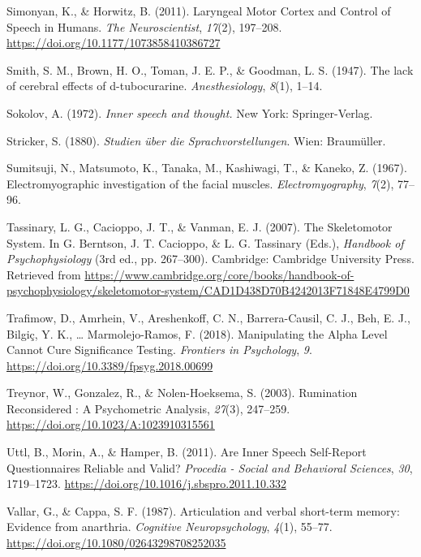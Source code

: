 \documentclass[a4paper,12pt,twoside,openright,oldfontcommands]{memoir}
\begin{document}
\hypertarget{ref-simonyan_laryngeal_2011}{}
Simonyan, K., \& Horwitz, B. (2011). Laryngeal Motor Cortex and Control
of Speech in Humans. \emph{The Neuroscientist}, \emph{17}(2), 197--208.
\url{https://doi.org/10.1177/1073858410386727}

\hypertarget{ref-smith_lack_1947}{}
Smith, S. M., Brown, H. O., Toman, J. E. P., \& Goodman, L. S. (1947).
The lack of cerebral effects of d-tubocurarine. \emph{Anesthesiology},
\emph{8}(1), 1--14.

\hypertarget{ref-sokolov_inner_1972}{}
Sokolov, A. (1972). \emph{Inner speech and thought.} New York:
Springer-Verlag.

\hypertarget{ref-stricker_studien_1880}{}
Stricker, S. (1880). \emph{Studien über die Sprachvorstellungen}. Wien:
Braumüller.

\hypertarget{ref-sumitsuji_electromyographic_1967}{}
Sumitsuji, N., Matsumoto, K., Tanaka, M., Kashiwagi, T., \& Kaneko, Z.
(1967). Electromyographic investigation of the facial muscles.
\emph{Electromyography}, \emph{7}(2), 77--96.

\hypertarget{ref-berntson_skeletomotor_2007}{}
Tassinary, L. G., Cacioppo, J. T., \& Vanman, E. J. (2007). The
Skeletomotor System. In G. Berntson, J. T. Cacioppo, \& L. G. Tassinary
(Eds.), \emph{Handbook of Psychophysiology} (3rd ed., pp. 267--300).
Cambridge: Cambridge University Press. Retrieved from
\url{https://www.cambridge.org/core/books/handbook-of-psychophysiology/skeletomotor-system/CAD1D438D70B4242013F71848E4799D0}

\hypertarget{ref-trafimow_manipulating_2018}{}
Trafimow, D., Amrhein, V., Areshenkoff, C. N., Barrera-Causil, C. J.,
Beh, E. J., Bilgiç, Y. K., \ldots{} Marmolejo-Ramos, F. (2018).
Manipulating the Alpha Level Cannot Cure Significance Testing.
\emph{Frontiers in Psychology}, \emph{9}.
\url{https://doi.org/10.3389/fpsyg.2018.00699}

\hypertarget{ref-treynor_rumination_2003}{}
Treynor, W., Gonzalez, R., \& Nolen-Hoeksema, S. (2003). Rumination
Reconsidered : A Psychometric Analysis, \emph{27}(3), 247--259.
\url{https://doi.org/10.1023/A:1023910315561}

\hypertarget{ref-Uttl2011}{}
Uttl, B., Morin, A., \& Hamper, B. (2011). Are Inner Speech Self-Report
Questionnaires Reliable and Valid? \emph{Procedia - Social and
Behavioral Sciences}, \emph{30}, 1719--1723.
\url{https://doi.org/10.1016/j.sbspro.2011.10.332}

\hypertarget{ref-vallar_articulation_1987}{}
Vallar, G., \& Cappa, S. F. (1987). Articulation and verbal short-term
memory: Evidence from anarthria. \emph{Cognitive Neuropsychology},
\emph{4}(1), 55--77. \url{https://doi.org/10.1080/02643298708252035}
\end{document}
